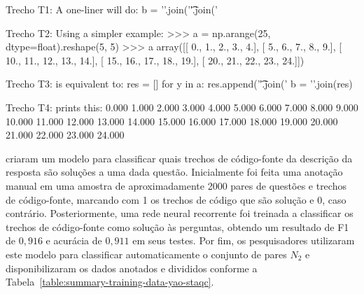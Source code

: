 \begin{tcolorbox}[colframe=orange!75!black,colback=gray!15!white,fonttitle=\bfseries,adjusted title=\large{Título da questão: convert 2d numpy array to string}~\ref{foot:exemplo-stackoverflow-mais-de-um-trecho}]
\begin{mypythongreen}{Trecho T1: A one-liner will do:}
b = '\n'.join('\t'.join('%
\end{mypythongreen}

\begin{mypythonred}{Trecho T2: Using a simpler example:}
>>> a = np.arange(25, dtype=float).reshape(5, 5)
>>> a
array([[  0.,   1.,   2.,   3.,   4.],
       [  5.,   6.,   7.,   8.,   9.],
       [ 10.,  11.,  12.,  13.,  14.],
       [ 15.,  16.,  17.,  18.,  19.],
       [ 20.,  21.,  22.,  23.,  24.]])
\end{mypythonred}
\begin{mypythongreen}{Trecho T3: is equivalent to:}
res = []
for y in a:
    res.append('\t'.join('%
b = '\n'.join(res)
\end{mypythongreen}
\begin{mypythonred}{Trecho T4: prints this:}
0.000   1.000   2.000   3.000   4.000
5.000   6.000   7.000   8.000   9.000
10.000  11.000  12.000  13.000  14.000
15.000  16.000  17.000  18.000  19.000
20.000  21.000  22.000  23.000  24.000
\end{mypythonred}
\end{tcolorbox}


 criaram um modelo para classificar quais trechos de código-fonte da descrição da resposta são soluções a uma dada questão. Inicialmente foi feita uma anotação manual em uma amostra de aproximadamente 2000 pares de questões e trechos de código-fonte, marcando com 1 os trechos de código que são solução e 0, caso contrário. Posteriormente, uma rede neural recorrente foi treinada a classificar os trechos de código-fonte como solução às perguntas, obtendo um resultado de F1 de $0,916$ e acurácia de $0,911$ em seus testes. Por fim, os pesquisadores utilizaram este modelo para classificar automaticamente o conjunto de pares $N_{2}$ e disponibilizaram os dados anotados e divididos conforme a Tabela~\ref{table:summary-training-data-yao-staqc}.

